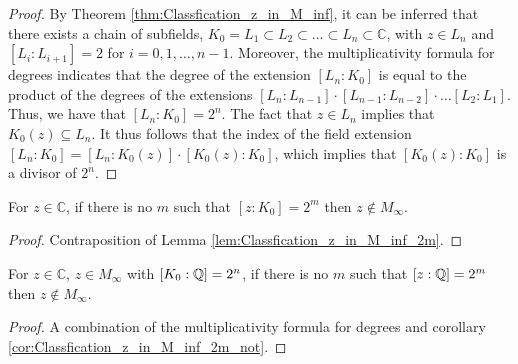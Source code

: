 \begin{proof}
    By Theorem \ref{thm:Classfication_z_in_M_inf}, it can be inferred that there exists a chain of subfields, $K_0 = L_1 \subset L_2 \subset \dots \subset L_n \subset \mathbb{C}$, with $z \in L_n$ and $[L_i : L_{i+1}] = 2$ for $i = 0, 1, \dots, n-1$. 
    Moreover, the multiplicativity formula for degrees indicates that the degree of the extension $[L_n : K_0]$ is equal to the product of the degrees of the extensions $[L_n : L_{n-1}] \cdot [L_{n-1} : L_{n-2}] \cdot \dots [L_2 : L_1]$.
    Thus, we have that $[L_n : K_0] = 2^n$. 
    The fact that $z\in L_n$ implies that $K_0(z)\subseteq L_n$. 
    It thus follows that the index of the field extension $[L_n : K_0] = [L_n : K_0(z)]\cdot [K_0(z) : K_0]$, which implies that $[K_0(z) : K_0]$ is a divisor of $2^n$. 
\end{proof}

\begin{corollary}
    \label{cor:Classfication_z_in_M_inf_2m_not}
    \leanok
    For $z \in \mathbb{C}$, if there is no $m$ such that $[z:K_0] = 2^m$ then $z \notin M_{\infty}$.
\end{corollary}

\begin{proof}
    Contraposition of Lemma \ref{lem:Classfication_z_in_M_inf_2m}.
\end{proof}

\begin{corollary}
    \label{cor:Classfication_z_in_M_inf_2m_rat}
    For $z \in \mathbb{C}$, $z \in M_{\infty}$ with $[K_0:\mathbb{Q}] = 2^n$,  if there is no $m$ such that $[z:\mathbb{Q}] = 2^m$ then $z \notin M_{\infty}$.
\end{corollary}

\begin{proof}
    A combination of the multiplicativity formula for degrees and corollary \ref{cor:Classfication_z_in_M_inf_2m_not}.
\end{proof}